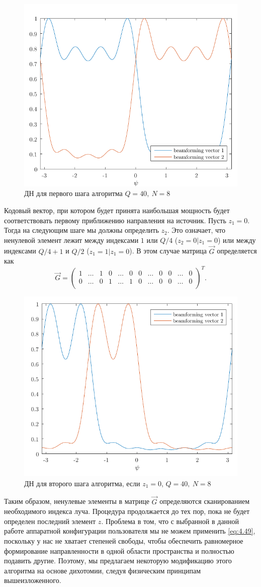 \begin{figure}[ht]
    \centering
    \includegraphics[width=0.5\linewidth]{figs/fig4.18}
    \caption{ДН для первого шага алгоритма $Q=40,~N=8$}
    \label{fig:4.18}
\end{figure}
Кодовый вектор, при котором будет принята наибольшая мощность будет соответствовать
первому приближению направления на источник. Пусть $z_1 = 0$. Тогда на следующим шаге
мы должны определить $z_2$. Это означает, что ненулевой элемент лежит между индексами $1$ или $Q/4$ ($z_2 =0 | z_1 =0$) или
между индексами $Q/4 + 1$ и $Q/2$ ($z_1 = 1 | z_1 = 0$). В этом случае матрица $\vec G$ определяется как
\begin{equation}
    \label{eq:4.50}
    \vec G =
    \begin{pmatrix}
        1 & \dots & 1 & 0 & \dots & 0 & 0 & \dots & 0 & 0 & \dots & 0 \\
        0 & \dots & 0 & 1 & \dots & 1 & 0 & \dots & 0 & 0 & \dots & 0 \\
    \end{pmatrix}^T.
\end{equation}
\begin{figure}[h!]
    \centering
    \includegraphics[width=0.5\linewidth]{figs/fig4.19}
    \caption{ДН для второго шага алгоритма, если $z_1=0$, $Q=40,~N=8$}
    \label{fig:4.19}
\end{figure}

Таким образом, ненулевые элементы в матрице $\vec G$ определяются сканированием необходимого индекса луча.
Процедура продолжается до тех пор, пока не будет определен последний элемент $z$. Проблема в том, что
с выбранной в данной работе аппаратной конфигурации пользователя мы не можем
применить \eqref{eq:4.49}, поскольку у нас не хватает степеней свободы, чтобы
обеспечить равномерное формирование направленности в одной области пространства
и полностью подавить другие. Поэтому, мы предлагаем некоторую модификацию этого алгоритма на основе дихотомии, следуя физическим принципам вышеизложенного.

